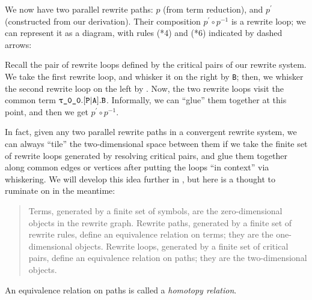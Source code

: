 \documentclass[../generics]{subfiles}
\begin{document}
\begin{example}
We now have two parallel rewrite paths: $p$ (from term reduction), and $p^\prime$ (constructed from our derivation). Their composition $p^\prime\circ p^{-1}$ is a rewrite loop; we can represent it as a diagram, with rules (*4) and (*6) indicated by dashed arrows:
\begin{center}
\end{center}
Recall the pair of rewrite loops defined by the critical pairs of our rewrite system. We take the first rewrite loop, and whisker it on the right by \texttt{B}; then, we whisker the second rewrite loop on the left by . Now, the two rewrite loops visit the common term $\texttt{$\uptau$\_0\_0}.[\texttt{P}|\texttt{A}].\texttt{B}$. Informally, we can ``glue'' them together at this point, and then we get $p^\prime\circ p^{-1}$.

In fact, given any two parallel rewrite paths in a convergent rewrite system, we can always ``tile'' the two-dimensional space between them if we take the finite set of rewrite loops generated by resolving critical pairs, and glue them together along common edges or vertices after putting the loops ``in context'' via whiskering. We will develop this idea further in , but here is a thought to ruminate on in the meantime:
\begin{quote}
Terms, generated by a finite set of symbols, are the zero-dimensional objects in the rewrite graph. Rewrite paths, generated by a finite set of rewrite rules, define an equivalence relation on terms; they are the one-dimensional objects. Rewrite loops, generated by a finite set of critical pairs, define an equivalence relation on paths; they are the two-dimensional objects.
\end{quote}
An equivalence relation on paths is called a \emph{homotopy relation}.
\end{example}
\end{document}
